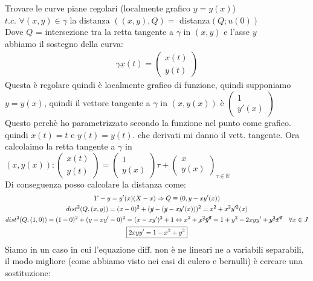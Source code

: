 \documentclass[a4paper, oneside]{article}
\begin{document}
\begin{example}
    Trovare le curve piane regolari (localmente grafico  $y = y(x)$)\\
    $t.c.$ $\forall (x,y) \in \gamma$ la distanza $((x,y) ,Q) = $ distanza$(Q;u(0))$\\
    Dove $Q$ = intersezione tra la retta tangente a $\gamma$ in $(x,y)$ e l'asse $y$
    \hfill\\
    abbiamo il sostegno della curva:
    \begin{gather*}
        \gamma \underline{x}(t) = \begin{pmatrix}
            x(t) \\
            y(t)
        \end{pmatrix}
    \end{gather*}
    Questa è regolare quindi è localmente grafico di funzione, quindi supponiamo $y=y(x)$, quindi il vettore tangente a $\gamma$ in $(x,y(x))$ è $\begin{pmatrix} 1 \\ y'(x) \end{pmatrix}$\\
    Questo perchè ho parametrizzato secondo la funzione nel punto come grafico. quindi $x(t) = t$ e $y(t) = y(t)$. che derivati mi danno il vett. tangente.
    Ora calcolaimo la retta tangente a $\gamma$ in $(x,y(x)) : \begin{pmatrix} x(t) \\ y(t) \end{pmatrix} = \begin{pmatrix} 1 \\ y(x) \end{pmatrix} \tau + \begin{pmatrix} x \\ y(x) \end{pmatrix}_{\tau \in \mathbb{R}}$\\
    Di conseguenza posso calcolare la distanza come:
    \begin{gather*}
        Y - y = y'(x) (X-x) \Rightarrow Q \equiv (0,y - xy'(x))\\
        dist^2 (Q,(x,y)) = (x-0)^2 + (\cancel{y} - (\cancel{y} -xy'(x)))^2 = x^2 + x^2y'^2(x)\\
        dist^2 (Q,(1,0)) = (1-0)^2 + (y-xy'-0)^2 = (x-xy')^2 +1 \leftrightarrow x^2 + \cancel{x^2y^2} = 1 + y^2 -2xyy' + \cancel{y^2x^2} \quad \forall x \in J\\
        \boxed{2xyy' = 1-x^2+y^2}
    \end{gather*}
    Siamo in un caso in cui l'equazione diff. non è ne lineari ne a variabili separabili, il modo migliore (come abbiamo visto nei casi di eulero e bernulli) è cercare una sostituzione:

\end{example}
\end{document}
